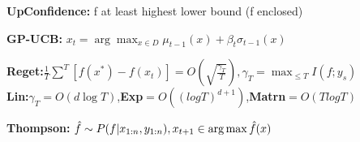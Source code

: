 \textbf{UpConfidence:} f at least highest lower bound (f enclosed)\\
\begin{comment}
	We assume here that the GP we are looking at has the function enclosed. This means, that the maximum of the function must be at least as high as the maximum lower bound. We can focus on the regions where this is true\\
\end{comment}

\textbf{GP-UCB:} $x_t = \arg \max_{x \in D} \mu_{t-1}(x) + \beta_t \sigma_{t-1}(x)$\\
\begin{comment}
	The goal is to maximise the upper confidence bound.
	\textbf{Assumption:} The underlying function really is something like the prior, f.e. a Gaussian. Also, we need this to hold for all the points, so we need to do a union bound over the points. This can be solved by using a large constant $\beta$.\\
	If Beta is huge, we just do uncertainty sampling. With a proper $\beta$, we naturally incorporate exploitation around the means.\\
	The optimization function is generally non-convex, can be optimized with SGD.\\
\end{comment}

\textbf{Reget:}$\frac{1}{T}\sum^T[f(x^*) - f(x_t)] = O(\sqrt{\frac{\gamma_T}{T}}), \gamma_T = \max_{\leq T} I(f;y_s)$\\
\textbf{Lin:}$\gamma_T = O(d \log T)$,\textbf{Exp}$= O((log T)^{d+1})$,\textbf{Matrn}$= O(TlogT)$\\
\begin{comment}
	\textbf{Intuition:} Depending on the kernel, the regret has different convergence/ regret guarantees.\\
\end{comment}

\textbf{Thompson:} $\hat{f} \sim P(f|x_{1:n}, y_{1:n}), x_{t+1} \in \operatorname*{arg\,max} \hat{f}(x)$






